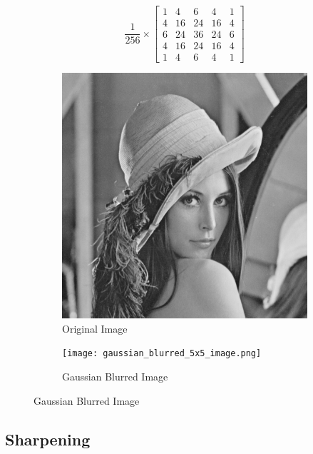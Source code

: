 \documentclass[12pt]{report}
\begin{document}
\begin{equation*}
    \frac{1}{256} \times
    \begin{bmatrix}
        1 & 4  & 6  & 4  & 1 \\
        4 & 16 & 24 & 16 & 4 \\
        6 & 24 & 36 & 24 & 6 \\
        4 & 16 & 24 & 16 & 4 \\
        1 & 4  & 6  & 4  & 1
    \end{bmatrix}
\end{equation*}

\begin{figure}[H]
    \centering
    \begin{subfigure}{0.4\textwidth}
        \centering
        \includegraphics[width=\linewidth]{Lena.png}
        \caption{Original Image}
    \end{subfigure}
    \begin{subfigure}{0.4\textwidth}
        \centering
        \texttt{[image: gaussian\_blurred\_5x5\_image.png]}
        \caption{Gaussian Blurred Image}
    \end{subfigure}
\end{figure}

\subsection{Sharpening}
\end{document}
